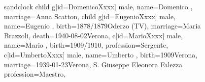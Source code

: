\documentclass{article}
\begin{document}
\begin{figure}
\begin{minipage}[b]{0.19\textwidth}
\centering

    \begin{genealogypicture}[
        processing=database,
        database format=full,
        node size=3.5cm,
        level size=2.8cm,
        level distance=6mm,
        list separators hang=3mm,
        name font=\bfseries,
        surn code={\textcolor{black!50!black}{#1}},
        place text={\newline}{},
        date format=d month yyyy,
        tcbset={male/.style={colframe=blue,colback=blue!5},
        female/.style={colframe=red,colback=red!5}},
        box={fit basedim=7pt,boxsep=2pt,segmentation style=solid,
            halign=left,before upper=\parskip1pt,
            \gtrDBsex,
        },
    ]
    sandclock
    {
        child{
            g[id=DomenicoXxxx] {
                male,
                name={Domenico },
                marriage={Anna Scatton}{},
            }
            child{
                g[id=EugenioXxxx]{
                    male,
                    name={Eugenio },
                    birth={1878/1879}{Oderzo (TV)},
                    marriage={Maria Brazzoli}{},
                    death={1940-08-02}{Verona},
                }
                c[id=MarioXxxx]{
                    male,
                    name={Mario },
                    birth={1909/1910}{},
                    profession={Sergente},
                }
                c[id=UmbertoXxxx]{
                    male,
                    name={Umberto },
                    birth={1909}{Verona},
                    marriage={1939-01-23}{Verona, S. Giuseppe \newline Eleonora Falezza}
                    profession={Maestro},
                }
            }
        }
    }
    \end{genealogypicture}

\end{minipage}
\hfill
\begin{minipage}[b]{0.19\textwidth}
\centering


\end{minipage}
\end{figure}
\end{document}

